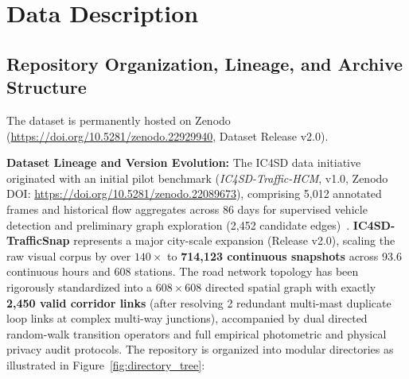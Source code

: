 \documentclass[preprint,12pt]{elsarticle}
\begin{document}
\section{Data Description}

\subsection{Repository Organization, Lineage, and Archive Structure}
The dataset is permanently hosted on Zenodo (\url{https://doi.org/10.5281/zenodo.22929940}, Dataset Release v2.0). 

\textbf{Dataset Lineage and Version Evolution:} The IC4SD data initiative originated with an initial pilot benchmark (\textit{IC4SD-Traffic-HCM}, v1.0, Zenodo DOI: \url{https://doi.org/10.5281/zenodo.22089673}), comprising 5,012 annotated frames and historical flow aggregates across 86 days for supervised vehicle detection and preliminary graph exploration (2,452 candidate edges)~\cite{le2026urban}. \textbf{IC4SD-TrafficSnap} represents a major city-scale expansion (Release v2.0), scaling the raw visual corpus by over $140\times$ to \textbf{714,123 continuous snapshots} across 93.6 continuous hours and 608 stations. The road network topology has been rigorously standardized into a $608 \times 608$ directed spatial graph with exactly \textbf{2,450 valid corridor links} (after resolving 2 redundant multi-mast duplicate loop links at complex multi-way junctions), accompanied by dual directed random-walk transition operators and full empirical photometric and physical privacy audit protocols. The repository is organized into modular directories as illustrated in Figure~\ref{fig:directory_tree}:
\end{document}
